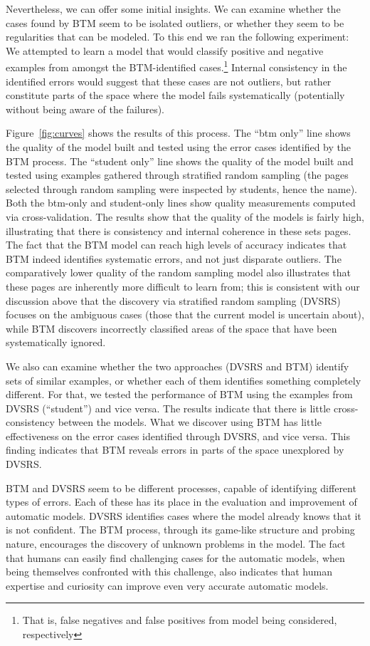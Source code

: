 Nevertheless, we can offer some initial insights. We can examine whether the cases found by BTM seem to be isolated outliers, or whether they seem to be regularities that can be modeled. To this end we ran the following experiment: We attempted to learn a model that would classify positive and negative examples from amongst the BTM-identified cases.\footnote{That is, false negatives and false positives from model being considered, respectively } Internal consistency in the identified errors would suggest that these cases are not outliers, but rather constitute parts of the space where the model fails systematically (potentially without being aware of the failures).

Figure~\ref{fig:curves} shows the results of this process. The ``btm only'' line shows the quality of the model built and tested using the error cases identified by the BTM process.  The ``student only'' line shows the quality of the model built and tested using examples gathered through stratified random sampling (the pages selected through random sampling were inspected by students, hence the name). Both the btm-only and student-only lines show quality measurements computed via cross-validation.  The results show that the quality of the models is fairly high, illustrating that there is consistency and internal coherence in these sets pages.  The fact that the BTM model can reach high levels of accuracy indicates that BTM indeed identifies systematic errors, and not just disparate outliers.  The comparatively lower quality of the random sampling model also illustrates that these pages are inherently more difficult to learn from; this is consistent with our discussion above that the discovery via stratified random sampling (DVSRS) focuses on the ambiguous cases (those that the current model is uncertain about), while BTM discovers incorrectly classified areas of the space that have been systematically ignored.

We also can examine whether the two approaches (DVSRS and BTM) identify sets of similar examples, or whether each of them identifies something completely different. For that, we tested the performance of BTM using the examples from DVSRS (``student'') and vice versa. The results indicate that there is little cross-consistency between the models. What we discover using BTM has little effectiveness on the error cases identified through DVSRS, and vice versa. This finding indicates  that BTM reveals errors in parts of the space unexplored by DVSRS.

BTM and DVSRS seem to be different processes, capable of identifying different types of errors. Each of these has its place in the evaluation and improvement of automatic models. DVSRS identifies cases where the model already knows that it is not confident. The BTM process, through its game-like structure and probing nature, encourages the discovery of unknown problems in the model. The fact that humans can easily find challenging cases for the automatic models, when being themselves confronted with this challenge, also indicates that human expertise and curiosity can improve even very accurate automatic models.



